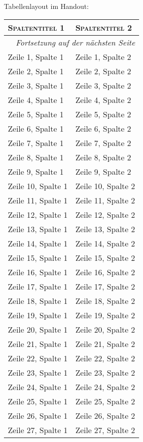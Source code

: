\begin{frame}[fragile]
\pagebreak

Tabellenlayout im Handout:

\begin{longtable}{|l|p{9.3cm}|}
\hline
\textsc{\textbf{Spaltentitel 1}} & \textsc{\textbf{Spaltentitel 2}}\\
\hline
\hline
\endhead
\hline\multicolumn{2}{|r|}{\textit{Fortsetzung auf der nächsten Seite}}\\
\hline
\endfoot
\endlastfoot
Zeile 1, Spalte 1 & Zeile 1, Spalte 2\\
Zeile 2, Spalte 1 & Zeile 2, Spalte 2\\
Zeile 3, Spalte 1 & Zeile 3, Spalte 2\\
Zeile 4, Spalte 1 & Zeile 4, Spalte 2\\
Zeile 5, Spalte 1 & Zeile 5, Spalte 2\\
Zeile 6, Spalte 1 & Zeile 6, Spalte 2\\
Zeile 7, Spalte 1 & Zeile 7, Spalte 2\\
Zeile 8, Spalte 1 & Zeile 8, Spalte 2\\
Zeile 9, Spalte 1 & Zeile 9, Spalte 2\\
Zeile 10, Spalte 1 & Zeile 10, Spalte 2\\
Zeile 11, Spalte 1 & Zeile 11, Spalte 2\\
Zeile 12, Spalte 1 & Zeile 12, Spalte 2\\
Zeile 13, Spalte 1 & Zeile 13, Spalte 2\\
Zeile 14, Spalte 1 & Zeile 14, Spalte 2\\
Zeile 15, Spalte 1 & Zeile 15, Spalte 2\\
Zeile 16, Spalte 1 & Zeile 16, Spalte 2\\
Zeile 17, Spalte 1 & Zeile 17, Spalte 2\\
Zeile 18, Spalte 1 & Zeile 18, Spalte 2\\
Zeile 19, Spalte 1 & Zeile 19, Spalte 2\\
Zeile 20, Spalte 1 & Zeile 20, Spalte 2\\
Zeile 21, Spalte 1 & Zeile 21, Spalte 2\\
Zeile 22, Spalte 1 & Zeile 22, Spalte 2\\
Zeile 23, Spalte 1 & Zeile 23, Spalte 2\\
Zeile 24, Spalte 1 & Zeile 24, Spalte 2\\
Zeile 25, Spalte 1 & Zeile 25, Spalte 2\\
Zeile 26, Spalte 1 & Zeile 26, Spalte 2\\
Zeile 27, Spalte 1 & Zeile 27, Spalte 2\\

\end{longtable}
\end{frame}
